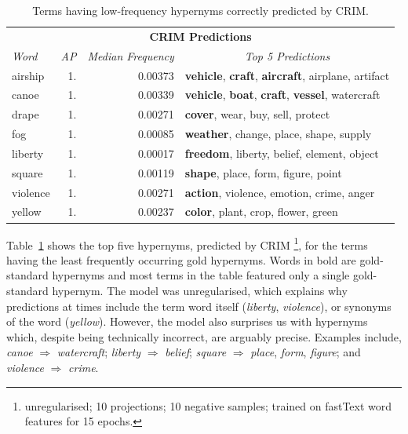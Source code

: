 \begin{table}\centering
    \begin{tabular}{@{}lrrl@{}} \toprule
    \multicolumn{4}{c}{\textbf{CRIM Predictions}} \\
    \textit{Word} & \textit{AP} & \textit{Median Frequency} & \multicolumn{1}{c}{\textit{Top 5 Predictions}} \\ \midrule
    airship & 1. & 0.00373 & \textbf{vehicle}, \textbf{craft}, \textbf{aircraft}, airplane, artifact \\
    canoe & 1. & 0.00339 & \textbf{vehicle}, \textbf{boat}, \textbf{craft}, \textbf{vessel}, watercraft \\
    drape & 1. & 0.00271 & \textbf{cover}, wear, buy, sell, protect \\
    fog & 1. & 0.00085 & \textbf{weather}, change, place, shape, supply\\
    liberty & 1. & 0.00017 & \textbf{freedom}, liberty, belief, element, object\\
    square & 1. & 0.00119 & \textbf{shape}, place, form, figure, point\\
    violence & 1. & 0.00271 & \textbf{action}, violence, emotion, crime, anger\\
    yellow & 1. & 0.00237 & \textbf{color}, plant, crop, flower, green\\
    \bottomrule
    \end{tabular}
    \caption{Terms having low-frequency hypernyms correctly predicted by CRIM.}\label{tab:crim_perfect_score}
\end{table}

Table~\ref{tab:crim_perfect_score} shows the top five hypernyms, predicted by CRIM \footnote{unregularised; 10 projections; 10 negative samples; trained on fastText word features for 15 epochs.}, for the terms having the least frequently occurring gold hypernyms.  Words in bold are gold-standard hypernyms and most terms in the table featured only a single gold-standard hypernym.  The model was unregularised, which explains why predictions at times include the term word itself (\textit{liberty}, \textit{violence}), or synonyms of the word (\textit{yellow}).  However, the model also surprises us with hypernyms which, despite being technically incorrect, are arguably precise.  Examples include, \textit{canoe} $\Rightarrow$ \textit{watercraft}; \textit{liberty} $\Rightarrow$ \textit{belief}; \textit{square} $\Rightarrow$ \textit{place}, \textit{form}, \textit{figure}; and \textit{violence} $\Rightarrow$ \textit{crime}. 


